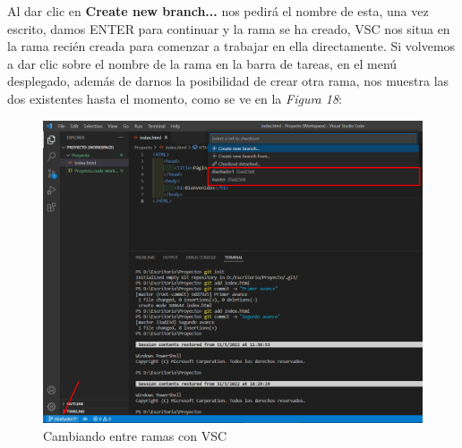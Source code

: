 \begin{enumerate}
    Al dar clic en \textbf{Create new branch...} nos pedirá el nombre de esta, una vez escrito, damos ENTER para continuar y la rama se ha creado, VSC nos situa en la rama recién creada para comenzar a trabajar en ella directamente. Si volvemos a dar clic sobre el nombre de la rama en la barra de tareas, en el menú desplegado, además de darnos la posibilidad de crear otra rama, nos muestra las dos existentes hasta el momento, como se ve en la \textit{Figura 18}:
    \begin{figure}[H]
        \begin{center}
            \caption{Cambiando entre ramas con VSC}
            \label{fig: 18}
            \includegraphics[width=14cm]{capturas/abriendo_b1.png}
        \end{center}
    \end{figure}
    

\end{enumerate}
